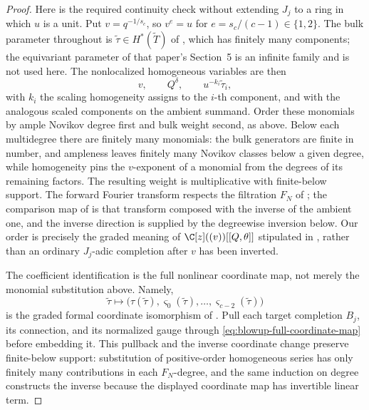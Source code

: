 \begin{proof}
Here is the required continuity check without extending \(J_j\) to a ring in
which \(u\) is a unit.  Put \(v=q^{-1/s_c}\), so \(v^e=u\) for
\(e=s_c/(c-1)\in\{1,2\}\).  The bulk parameter throughout is
\(\widetilde\tau\in H^*(\widetilde T)\) of \cite[Theorem~5.18]{IritaniBlowup},
which has finitely many components; the equivariant parameter of that paper's
Section~5 is an infinite family and is not used here.  The nonlocalized
homogeneous variables are then
\[
 v,\qquad Q^\delta,\qquad
 u^{-k_i}\widetilde\tau_i,
 \tag{4.4a}
 \label{eq:blowup-scaled-completion-variables}
\]
with \(k_i\) the scaling homogeneity assigns to the \(i\)-th component, and
with the analogous scaled components on the ambient summand.  Order these
monomials by ample Novikov degree first and bulk weight second, as above.
Below each multidegree there are finitely many monomials: the bulk generators
are finite in number, and ampleness leaves finitely many Novikov classes below
a given degree, while homogeneity pins the \(v\)-exponent of a monomial from
the degrees of its remaining factors.  The resulting weight is multiplicative
with finite-below support.  The forward Fourier transform respects the
filtration \(F_N\) of
\cite[Proposition~5.4, especially (5.13)--(5.14)]{IritaniBlowup}; the
comparison map of \cite[Theorem~5.18]{IritaniBlowup} is that transform
composed with the inverse of the ambient one, and the inverse direction is
supplied by the degreewise inversion below.  Our order
is precisely the graded meaning of
\(\C[z]((v))[[Q,\theta]]\) stipulated in
\cite[Remarks~1.3--1.5]{IritaniBlowup}, rather than an ordinary \(J_j\)-adic
completion after \(v\) has been inverted.

The coefficient identification is the full nonlinear coordinate map, not
merely the monomial substitution above.  Namely,
\[
 \widetilde\tau\longmapsto
 \bigl(\tau(\widetilde\tau),
       \varsigma_0(\widetilde\tau),\ldots,
       \varsigma_{c-2}(\widetilde\tau)\bigr)
 \tag{4.4b}
 \label{eq:blowup-full-coordinate-map}
\]
is the graded formal coordinate isomorphism of
\cite[Corollary~1.2 and Theorem~5.18]{IritaniBlowup}.  Pull each target
completion \(B_j\), its connection, and its normalized gauge through
\eqref{eq:blowup-full-coordinate-map} before embedding it.  This pullback and
the inverse coordinate change preserve finite-below support: substitution
of positive-order homogeneous series has only finitely many contributions
in each \(F_N\)-degree, and the same induction on degree constructs the
inverse because the displayed coordinate map has invertible linear term.


\end{proof}
